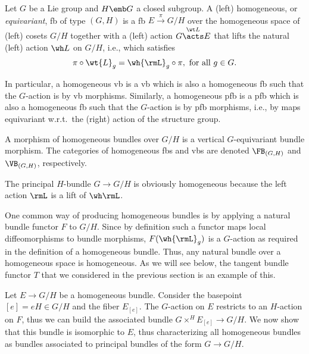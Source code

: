 \begin{defn}
    Let $G$ be a Lie group and $H\emb G$ a closed subgroup. A (left) homogeneous, or \emph{equivariant}, \gls{fb} of type $(G,H)$ is a \gls{fb} $E\overset{\pi}{\to}G\slash H$ over the homogeneous space of (left) cosets $G\slash H$ together with a (left) action $G\overset{\wt L}{\acts} E$ that lifts the natural (left) action $\wh L$ on $G\slash H$, i.e., which satisfies \[\pi\circ \wt{L}_g=\wh{\rmL}_g\circ \pi,\text{ for all } g\in G.\] 

    In particular, a homogeneous \gls{vb} is a \gls{vb} which is also a homogeneous \gls{fb} such that the $G$-action is by \gls{vb} morphisms. Similarly, a homogeneous \gls{pfb} is a \gls{pfb} which is also a homogeneous \gls{fb} such that the $G$-action is by \gls{pfb} morphisms, i.e., by maps equivariant w.r.t.\ the (right) action of the structure group.

    A morphism of homogeneous bundles over $G\slash H$ is a vertical $G$-equivariant bundle morphism. The categories of homogeneous \glspl{fb} and \glspl{vb} are denoted $\FB_{(G,H)}$ and $\VB_{(G,H)}$, respectively. 
\end{defn}

\begin{example}
    The principal $H$-bundle $G\to G\slash H$ is obviously homogeneous because the left action $\rmL$ is a lift of $\wh \rmL$.
\end{example}

One common way of producing homogeneous bundles is by applying a natural bundle functor $F$ to $G\slash H$. Since by definition such a functor maps local diffeomorphisms to bundle morphisms, $F(\wh{\rmL}_g)$ is a $G$-action as required in the definition of a homogeneous bundle. Thus, any natural bundle over a homogeneous space is homogeneous. As we will see below, the tangent bundle functor $T$ that we considered in the previous section is an example of this.

Let $E\to G\slash H$ be a homogeneous bundle. Consider the basepoint $[e]=eH\in G\slash H$ and the fiber $E_{[e]}$. The $G$-action on $E$ restricts to an $H$-action on $F$, thus we can build the associated bundle $G\times^H E_{[e]}\to G\slash H$. We now show that this bundle is isomorphic to $E$, thus characterizing all homogeneous bundles as bundles associated to principal bundles of the form $G\to G\slash H$.

